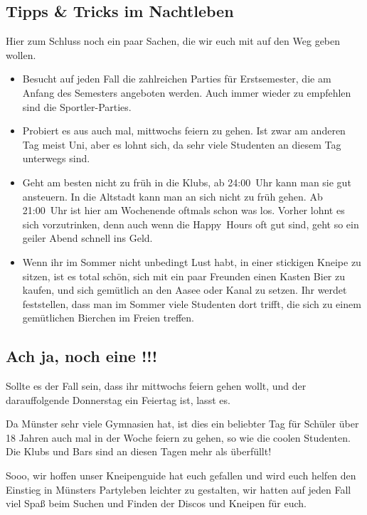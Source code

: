 \begin{multicols*}{2}
\subsection*{Tipps \& Tricks im Nachtleben}
Hier zum Schluss noch ein paar Sachen, die wir euch mit auf den Weg geben wollen.
\begin{itemize}
\item Besucht auf jeden Fall die zahlreichen Parties für Erstsemester, die am Anfang des Semesters angeboten werden. Auch immer wieder zu empfehlen sind die Sportler-Parties.
\item Probiert es aus auch mal, mittwochs feiern zu gehen. Ist zwar am anderen Tag meist Uni, aber es lohnt sich, da sehr viele Studenten an diesem Tag unterwegs sind.
\item Geht am besten nicht zu früh in die Klubs, ab 24:00~Uhr kann man sie gut ansteuern. In die Altstadt kann man an sich nicht zu früh gehen. Ab 21:00~Uhr ist hier am Wochenende oftmals schon was los. Vorher lohnt es sich vorzutrinken, denn auch wenn die Happy~Hours oft gut sind, geht so ein geiler Abend schnell ins Geld.
\item Wenn ihr im Sommer nicht unbedingt Lust habt, in einer stickigen Kneipe zu sitzen, ist es total schön, sich mit ein paar Freunden einen Kasten Bier zu kaufen, und sich gemütlich an den Aasee oder Kanal zu setzen. Ihr werdet feststellen, dass man im Sommer viele Studenten dort trifft, die sich zu einem gemütlichen Bierchen im Freien treffen.
\end{itemize}

\subsection*{Ach ja, noch eine \underline{}!!!}
Sollte es der Fall sein, dass ihr mittwochs feiern gehen wollt, und der darauffolgende Donnerstag ein Feiertag ist, lasst es.

Da Münster sehr viele Gymnasien hat, ist dies ein beliebter Tag für Schüler über 18 Jahren auch mal in der Woche feiern zu gehen, so wie die coolen Studenten. Die Klubs und Bars sind an diesen Tagen mehr als überfüllt!

Sooo, wir hoffen unser Kneipenguide hat euch gefallen und wird euch helfen den Einstieg in Münsters Partyleben leichter zu gestalten, wir hatten auf jeden Fall viel Spaß beim Suchen und Finden der Discos und Kneipen für euch.

\end{multicols*}
